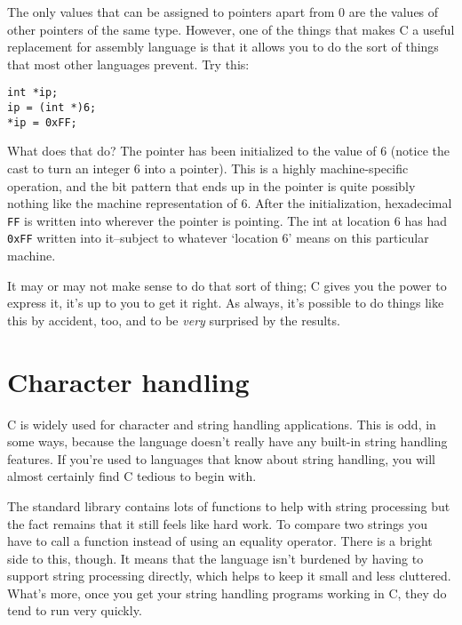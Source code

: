    The only values that can be assigned to pointers apart from 0 are the
    values of other pointers of the same type. However, one of the things
    that makes C a useful replacement for assembly language is that it
    allows you to do the sort of things that most other languages prevent.
    Try this:


   \begin{Verbatim}
int *ip;
ip = (int *)6;
*ip = 0xFF;
\end{Verbatim}

   What does that do? The pointer has been initialized to the value of
    6 (notice the cast to turn an integer 6 into a pointer). This is
    a highly machine-specific operation, and the bit pattern that ends up in
    the pointer is quite possibly nothing like the machine representation of
    6.  After the initialization, hexadecimal \texttt{FF} is written into
    wherever the pointer is pointing. The int at location 6 has had
    \texttt{0xFF} written into it--subject to whatever
    `location 6' means on this particular machine.


   It may or may not make sense to do that sort of thing; C gives you the
    power to express it, it's up to you to get it right. As always, it's
    possible to do things like this by accident, too, and to be
    \textit{very} surprised by the results.


  
        \section{Character handling}
        

  

  C is widely used for character and string handling applications. This
   is odd, in some ways, because the language doesn't really have any
   built-in string handling features. If you're used to languages that know
   about string handling, you will almost certainly find C tedious to begin
   with.


  The standard library contains lots of functions to help with string
   processing but the fact remains that it still feels like hard work. To
   compare two strings you have to call a function instead of using an
   equality operator. There is a bright side to this, though. It means that
   the language isn't burdened by having to support string processing
   directly, which helps to keep it small and less cluttered. What's more,
   once you get your string handling programs working in C, they do tend to
   run very quickly.


